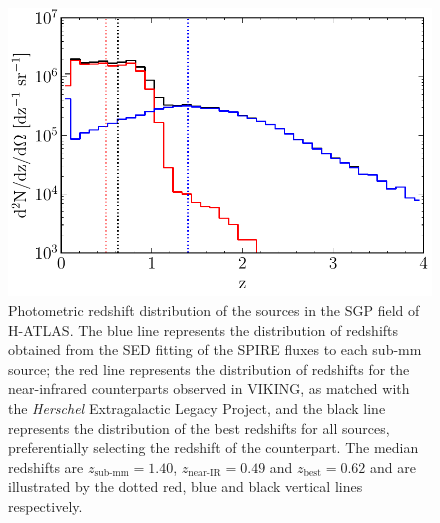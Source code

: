 \begin{figure}
    \centering
    \includegraphics[width=\columnwidth]{Figures/redshift_distribution.pdf}
    \caption{Photometric redshift distribution of the sources in the SGP field of H-ATLAS. The blue line represents the distribution of redshifts obtained from the SED fitting of the SPIRE fluxes to each sub-mm source; the red line represents the distribution of redshifts for the near-infrared counterparts observed in VIKING, as matched with the \textit{Herschel} Extragalactic Legacy Project, and the black line represents the distribution of the best redshifts for all sources, preferentially selecting the redshift of the counterpart. The median redshifts are $z_{\textrm{sub-mm}} = 1.40$, $z_{\textrm{near-IR}} = 0.49$ and $z_{\textrm{best}} = 0.62$ and are illustrated by the dotted red, blue and black vertical lines respectively.}
    \label{fig:redshift_distribution}
\end{figure}

\listoftodos